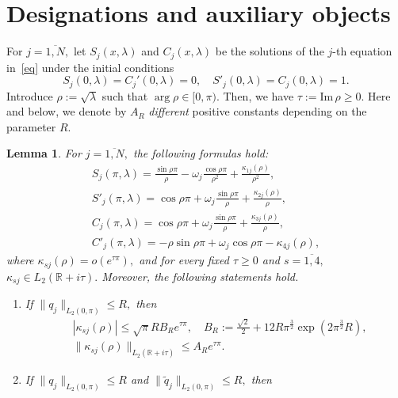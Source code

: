 \documentclass[a4paper, 12pt] {article}
\theoremstyle{plain}
\newtheorem{lemma}{\indent Lemma}
\theoremstyle{remark}
\theoremstyle{plain}
\theoremstyle{definition}
\numberwithin{equation}{section}
\begin{document}
\section{Designations and auxiliary objects}
\label{aux}

For $j=\overline{1, N},$ let $S_j(x, \lambda)$ and $C_j(x, \lambda)$ be the solutions of the $j$-th equation in~\eqref{eq} under the initial conditions
$$S_j(0, \lambda) = C_j'(0, \lambda) =0, \quad S'_j(0, \lambda) = C_j(0, \lambda) =1. $$
Introduce $\rho := \sqrt{\lambda}$ such that $\arg \rho\in [0, \pi).$
Then, we have $\tau := \mathrm{Im}\, \rho \ge 0.$
Here and below, we denote by $A_{R}$ {\it different} positive constants depending on the parameter $R.$
\begin{lemma} \label{S_j lemma}
For $j=\overline{1, N},$ the following formulas hold:
\begin{equation} \label{S_j}
\begin{split}
S_j(\pi, \lambda) = \frac{\sin \rho \pi}{\rho} - \omega_j \frac{\cos \rho\pi}{\rho^2} +\frac{\kappa_{1j}(\rho)}{\rho^2},
\\[2mm]
S'_j(\pi, \lambda) = \cos \rho \pi + \omega_j \frac{\sin \rho \pi}{\rho} + \frac{\kappa_{2j}(\rho)}{\rho},
\\[2mm]
C_j(\pi, \lambda) =\cos \rho \pi + \omega_j \frac{\sin \rho \pi}{\rho} + \frac{\kappa_{3j}(\rho)}{\rho},
\\[2mm]
C'_j(\pi, \lambda) =-\rho\sin \rho \pi + \omega_j \cos \rho \pi - \kappa_{4j}(\rho),
\end{split}
\end{equation}
where $\kappa_{sj}(\rho) = o(e^{\tau \pi}),$ and for every fixed $\tau \ge 0$ and $s=\overline{1, 4},$ $\kappa_{sj} \in L_2(\mathbb{R}+i\tau).$  Moreover, the following statements hold.
\begin{enumerate}
\item
If $\| q_j\|_{L_2(0, \pi)} \le R,$ then
\begin{equation} \label{kappa_sj}
\begin{split}
&|\kappa_{sj}(\rho)| \le \sqrt\pi R B_R e^{\tau \pi}, \quad B_R := \frac{\sqrt 2}{2} + 12R \pi^{\frac32}\exp(2\pi^{\frac32}R),\\
&\|\kappa_{sj}(\rho)\|_{L_2(\mathbb R + i \tau)} \le A_R e^{\tau \pi}.
\end{split}
\end{equation}
\item If $\| q_j\|_{L_2(0, \pi)} \le R$ and $\| \tilde q_j\|_{L_2(0, \pi)} \le R,$ then

\end{enumerate}
\end{lemma}
\end{document}
